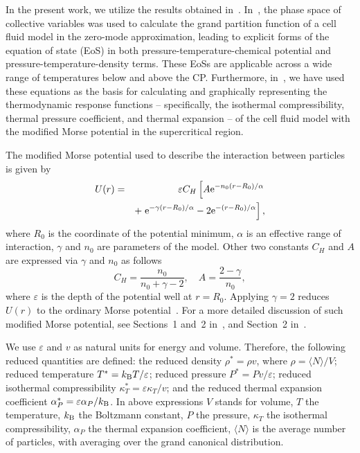 In the present work, we utilize the results obtained in~\cite{KD20,DKRP24arxiv,DKRP24}. In~\cite{KD20}, the phase space of collective variables was used to calculate the grand partition function of a cell fluid model in the zero-mode approximation, leading to explicit forms of the equation of state (EoS) in both pressure-temperature-chemical potential and pressure-temperature-density terms.
These EoSs are applicable across a wide range of temperatures below and above the CP. Furthermore, in~\cite{DKRP24arxiv,DKRP24}, we have used these equations as the basis for calculating and graphically representing the thermodynamic response functions \--- specifically, the isothermal compressibility, thermal pressure coefficient, and thermal expansion \--- of the cell fluid model with the modified Morse potential in the supercritical region.

The modified Morse potential used to describe the interaction between particles is given by 
\begin{eqnarray}
	\label{def:mod_morse}
	U(r) & = & \varepsilon C_{H} \left[A {\rm e}^{-n_0(r-R_0)/\alpha} \right.
	\nonumber\\
	&& + \left. {\rm e}^{-\gamma(r - R_0)/\alpha} -2{\rm e}^{-(r-R_0)/\alpha}\right],
\end{eqnarray}
where $R_0$ is the coordinate of the potential minimum, $\alpha$ is an effective range of interaction, $\gamma$ and $n_0$ are parameters of the model. Other two constants $C_{H}$ and $A$ are expressed via $\gamma$ and $n_0$ as follows
\begin{equation}
	C_{H} = \frac{n_0}{n_0 + \gamma - 2}, \quad A = \frac{2 - \gamma}{n_0},
\end{equation}
where $\varepsilon$ is the depth of the potential well at $r=R_0$. Applying $\gamma=2$ reduces $U(r)$ to the ordinary Morse potential~\cite{Morse29}. For a more detailed discussion of such modified Morse potential, see Sections~1 and~2 in~\cite{KD20}, and Section~2 in~\cite{DKRP24arxiv}.

We use $\varepsilon$ and $v$ as natural units for energy and volume. Therefore, the following reduced quantities are defined: the reduced density $\rho^*=\rho v$, where $\rho = \langle N \rangle /V$; reduced temperature $T^* = k_{\rm B}T/\varepsilon$; reduced pressure $P^* = Pv/\varepsilon$; reduced isothermal compressibility $\kappa^*_{T} = \varepsilon \kappa_T/v$; and the reduced thermal expansion coefficient $\alpha^*_{P} = \varepsilon \alpha_{P} / k_{\rm B}$. In above expressions $V$ stands for volume, $T$ the temperature, $k_{\rm B}$ the Boltzmann constant, $P$ the pressure, $\kappa_T$ the isothermal compressibility, $\alpha_{P}$ the thermal expansion coefficient, $\langle N \rangle$ is the average number of particles, with averaging over the grand canonical distribution.

